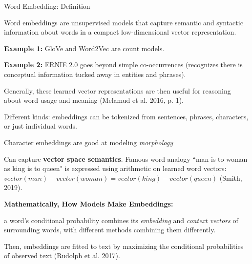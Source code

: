\begin{frame}{Word Embedding: Definition}
    
    \begin{itemizeSpaced}{4pt}
        \item Word embeddings are unsupervised models that capture semantic and syntactic information about words in a compact low-dimensional vector representation. 
        
        \begin{itemizeSpaced}{0pt}
            \item \textbf{Example 1: } GloVe and Word2Vec are count models.
        
            \item \textbf{Example 2: }ERNIE 2.0 goes beyond simple co-occurrences (recognizes there is conceptual information tucked away in entities and phrases).
        \end{itemizeSpaced}
        
        \item Generally, these learned vector representations are then useful for reasoning about word usage and meaning (Melamud et al. 2016, p. 1).
        
        \item Different kinds: embeddings can be tokenized from sentences, phrases, characters, or just individual words. 
        \begin{itemizeSpaced}{2pt}
            \item Character embeddings are good at modeling \emph{morphology}
        \end{itemizeSpaced}
        
        \item Can capture \textbf{vector space semantics}. Famous word analogy ``man is to woman as king is to queen" is expressed using arithmetic on learned word vectors: $vector(man) - vector(woman) = vector(king) - vector(queen)$ (Smith, 2019).
        
        \item \textbf{Mathematically, How Models Make Embeddings: }
        \begin{itemizeSpaced}{0pt}
            \item a word’s conditional probability combines its \emph{embedding} and \emph{context vectors} of surrounding words, with different methods combining them differently. 
            
            \item Then, embeddings are fitted to text by maximizing the conditional probabilities of observed text (Rudolph et al. 2017).
        \end{itemizeSpaced}
    \end{itemizeSpaced}
    
    
\end{frame}





